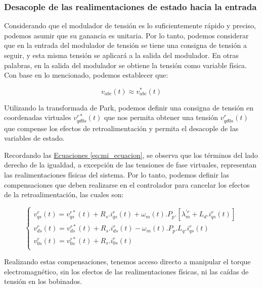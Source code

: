 \documentclass{article}
\begin{document}

\subsubsection*{Desacople de las realimentaciones de estado hacia la entrada}

Considerando que el modulador de tensión es lo suficientemente rápido y preciso, podemos asumir que su ganancia 
es unitaria. Por lo tanto, podemos considerar que en la entrada del modulador de tensión se tiene una consigna 
de tensión a seguir, y esta misma tensión se aplicará a la salida del modulador. 
En otras palabras, en la salida del modulador se obtiene la tensión como variable física. Con base en lo 
mencionado, podemos establecer que:

\begin{equation}
    v_{abc}(t) \approx v^*_{abc}(t)
\end{equation}

Utilizando la transformada de Park, podemos definir una consigna de tensión en coordenadas virtuales 
$v^{r*}_{qd0s}(t)$ que nos permita obtener una tensión $v^{r}_{qd0s}(t)$ que compense los efectos de 
retroalimentación y permita el desacople de las variables de estado.

Recordando las \hyperref[eq:mi_ecuacion]{Ecuaciones \ref*{eq:mi_ecuacion}}, se observa que los términos 
del lado derecho de la igualdad, a excepción de las tensiones de fase virtuales, representan las 
realimentaciones físicas del sistema. Por lo tanto, podemos definir las compensaciones que deben 
realizarse en el controlador para cancelar los efectos de la retroalimentación, las cuales son:

\begin{equation}\label{eq:compensaciones}
    \begin{cases}
        v^r_{qs}(t) = v^{r*}_{qs}(t) + R_{s}.i_{qs}^r(t) + \omega_m(t).P_p.[\lambda^{\prime r}_m + L_d.i_{qs}^r(t)] \\
        v^r_{ds}(t) = v^{r*}_{ds}(t) + R_{s}.i_{ds}^r(t) - \omega_m(t).P_p.L_q.i_{qs}^r(t) \\
        v^r_{0s}(t) = v^{r*}_{0s}(t) + R_{s}.i_{0s}^r(t) \\
    \end{cases}
\end{equation}

Realizando estas compensaciones, tenemos acceso directo a manipular el torque electromagnético, 
sin los efectos de las realimentaciones físicas, ni las caídas de tensión en los bobinados.
\end{document}

